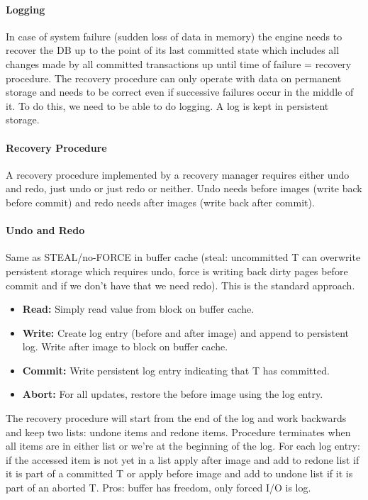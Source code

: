\paragraph{Logging}
In case of system failure (sudden loss of data in memory) the engine needs to recover the DB up to the point of its last committed state which includes all changes made by all committed transactions up until time of failure = recovery procedure. The recovery procedure can only operate with data on permanent storage and needs to be correct even if successive failures occur in the middle of it. To do this, we need to be able to do logging. A log is kept in persistent storage.


\paragraph{Recovery Procedure}
A recovery procedure implemented by a recovery manager requires either undo and redo, just undo or just redo or neither. Undo needs before images (write back before commit) and redo needs after images (write back after commit).

\paragraph{Undo and Redo}
Same as STEAL/no-FORCE in buffer cache (steal: uncommitted T can overwrite persistent storage which requires undo, force is writing back dirty pages before commit and if we don't have that we need redo). This is the standard approach.
\begin{itemize}
    \item \textbf{Read:} Simply read value from block on buffer cache.
    \item \textbf{Write:} Create log entry (before and after image) and append to persistent log. Write after image to block on buffer cache.
    \item \textbf{Commit:} Write persistent log entry indicating that T has committed.
    \item \textbf{Abort:} For all updates, restore the before image using the log entry.
\end{itemize}
The recovery procedure will start from the end of the log and work backwards and keep two lists: undone items and redone items. Procedure terminates when all items are in either list or we're at the beginning of the log. For each log entry: if the accessed item is not yet in a list apply after image and add to redone list if it is part of a committed T or apply before image and add to undone list if it is part of an aborted T. Pros: buffer has freedom, only forced I/O is log.

